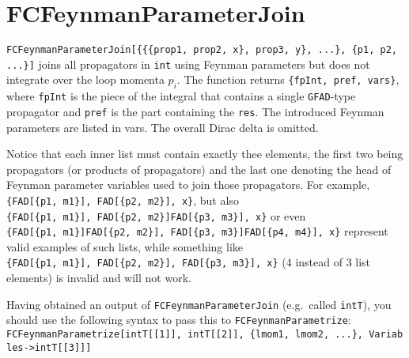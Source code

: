 \documentclass[../FeynCalcManual.tex]{subfiles}
\begin{document}
\hypertarget{fcfeynmanparameterjoin}{
\section{FCFeynmanParameterJoin}\label{fcfeynmanparameterjoin}}

\texttt{FCFeynmanParameterJoin[\allowbreak{}\{\allowbreak{}\{\allowbreak{}\{\allowbreak{}prop1,\ \allowbreak{}prop2,\ \allowbreak{}x\},\ \allowbreak{}prop3,\ \allowbreak{}y\},\ \allowbreak{}...\},\ \allowbreak{}\{\allowbreak{}p1,\ \allowbreak{}p2,\ \allowbreak{}...\}]}
joins all propagators in \texttt{int} using Feynman parameters but does
not integrate over the loop momenta \(p_i\). The function returns
\texttt{\{\allowbreak{}fpInt,\ \allowbreak{}pref,\ \allowbreak{}vars\}},
where \texttt{fpInt} is the piece of the integral that contains a single
\texttt{GFAD}-type propagator and \texttt{pref} is the part containing
the \texttt{res}. The introduced Feynman parameters are listed in vars.
The overall Dirac delta is omitted.

Notice that each inner list must contain exactly thee elements, the
first two being propagators (or products of propagators) and the last
one denoting the head of Feynman parameter variables used to join those
propagators. For example,
\texttt{\{\allowbreak{}FAD[\allowbreak{}\{\allowbreak{}p1,\ \allowbreak{}m1\}],\ \allowbreak{}FAD[\allowbreak{}\{\allowbreak{}p2,\ \allowbreak{}m2\}],\ \allowbreak{}x\}},
but also
\texttt{\{\allowbreak{}FAD[\allowbreak{}\{\allowbreak{}p1,\ \allowbreak{}m1\}],\ \allowbreak{}FAD[\allowbreak{}\{\allowbreak{}p2,\ \allowbreak{}m2\}]FAD[\allowbreak{}\{\allowbreak{}p3,\ \allowbreak{}m3\}],\ \allowbreak{}x\}}
or even
\texttt{\{\allowbreak{}FAD[\allowbreak{}\{\allowbreak{}p1,\ \allowbreak{}m1\}]FAD[\allowbreak{}\{\allowbreak{}p2,\ \allowbreak{}m2\}],\ \allowbreak{}FAD[\allowbreak{}\{\allowbreak{}p3,\ \allowbreak{}m3\}]FAD[\allowbreak{}\{\allowbreak{}p4,\ \allowbreak{}m4\}],\ \allowbreak{}x\}}
represent valid examples of such lists, while something like
\texttt{\{\allowbreak{}FAD[\allowbreak{}\{\allowbreak{}p1,\ \allowbreak{}m1\}],\ \allowbreak{}FAD[\allowbreak{}\{\allowbreak{}p2,\ \allowbreak{}m2\}],\ \allowbreak{}FAD[\allowbreak{}\{\allowbreak{}p3,\ \allowbreak{}m3\}],\ \allowbreak{}x\}}
(4 instead of 3 list elements) is invalid and will not work.

Having obtained an output of \texttt{FCFeynmanParameterJoin}
(e.g.~called \texttt{intT}), you should use the following syntax to pass
this to \texttt{FCFeynmanParametrize}:
\texttt{FCFeynmanParametrize[\allowbreak{}intT[\allowbreak{}[\allowbreak{}1]],\ \allowbreak{}intT[\allowbreak{}[\allowbreak{}2]],\ \allowbreak{}\{\allowbreak{}lmom1,\ \allowbreak{}lmom2,\ \allowbreak{}...\},\ \allowbreak{}Variables->intT[\allowbreak{}[\allowbreak{}3]]]}
\end{document}
